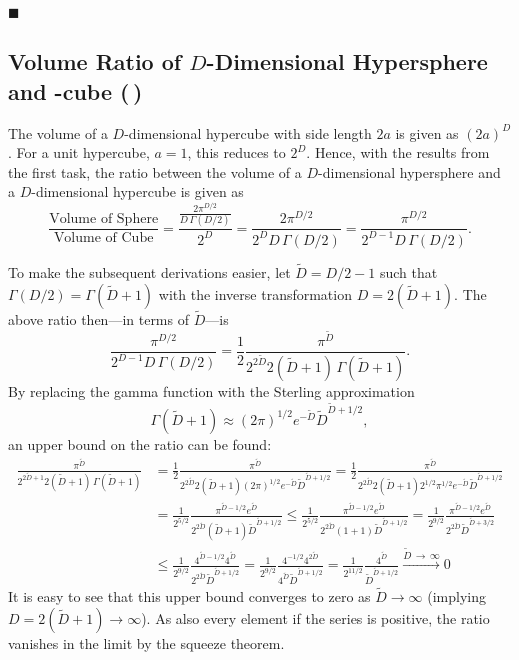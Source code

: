 \documentclass[11pt, a4paper]{scrartcl}
\newcommand{\eot}{\hfill\(\blacksquare\)}
\newcommand{\diffstar}{\texorpdfstring{\raisebox{-1pt}{\resizebox{!}{8pt}{\(\star\)}}}{*}}
\newcommand{\twostar}  {(\diffstar\,\diffstar)}
\begin{document}
			\eot

		\subsection{Volume Ratio of \(D\)-Dimensional Hypersphere and -cube  \twostar}
			The volume of a \(D\)-dimensional hypercube with side length \(2a\) is given as \((2a)^D\). For a unit hypercube, \(a = 1\), this reduces to \(2^D\). Hence, with the results from the first task, the ratio between the volume of a \(D\)-dimensional hypersphere and a \(D\)-dimensional hypercube is given as
			\begin{equation}
				\frac{\text{Volume of Sphere}}{\text{Volume of Cube}}
					= \frac{\frac{2 \pi^{D/2}}{D \, \Gamma(D / 2)}}{2^D}
					= \frac{2 \pi^{D/2}}{2^D D \, \Gamma(D / 2)}
					= \frac{\pi^{D/2}}{2^{D - 1} D \, \Gamma(D / 2)}.
			\end{equation}

			To make the subsequent derivations easier, let \( \tilde{D} = D/2 - 1 \) such that \( \Gamma(D/2) = \Gamma(\tilde{D} + 1) \) with the inverse transformation \( D = 2 (\tilde{D} + 1) \). The above ratio then---in terms of \(\tilde{D}\)---is
			\begin{equation}
				\frac{\pi^{D/2}}{2^{D - 1} D \, \Gamma(D / 2)}
					= \frac{1}{2} \frac{\pi^{\tilde{D}}}{2^{2 \tilde{D}} 2 (\tilde{D} + 1) \, \Gamma(\tilde{D} + 1)}.
			\end{equation}
			By replacing the gamma function with the Sterling approximation
			\begin{equation}
				\Gamma(\tilde{D} + 1) \approx (2\pi)^{1/2} e^{-\tilde{D}} \tilde{D}^{\tilde{D} + 1/2},
			\end{equation}
			an upper bound on the ratio can be found:
			\begin{align}
				\frac{\pi^{\tilde{D}}}{2^{2 \tilde{D} + 1} 2 (\tilde{D} + 1) \, \Gamma(\tilde{D} + 1)}
					&= \frac{1}{2} \frac{\pi^{\tilde{D}}}{2^{2 \tilde{D}} 2 (\tilde{D} + 1) (2\pi)^{1/2} e^{-\tilde{D}} \tilde{D}^{\tilde{D} + 1/2}}
					 = \frac{1}{2} \frac{\pi^{\tilde{D}}}{2^{2 \tilde{D}} 2 (\tilde{D} + 1) 2^{1/2} \pi^{1/2} e^{-\tilde{D}} \tilde{D}^{\tilde{D} + 1/2}} \\
					&= \frac{1}{2^{5/2}} \frac{\pi^{\tilde{D} - 1/2} e^{\tilde{D}}}{2^{2 \tilde{D}} (\tilde{D} + 1) \tilde{D}^{\tilde{D} + 1/2}}
					 \leq \frac{1}{2^{5/2}} \frac{\pi^{\tilde{D} - 1/2} e^{\tilde{D}}}{2^{2 \tilde{D}} (1 + 1) \tilde{D}^{\tilde{D} + 1/2}}
					 = \frac{1}{2^{9/2}} \frac{\pi^{\tilde{D} - 1/2} e^{\tilde{D}}}{2^{2 \tilde{D}} \tilde{D}^{\tilde{D} + 3/2}} \\
					&\leq \frac{1}{2^{9/2}} \frac{4^{\tilde{D} - 1/2} 4^{\tilde{D}}}{2^{2 \tilde{D}} \tilde{D}^{\tilde{D} + 1/2}}
					 = \frac{1}{2^{9/2}} \frac{4^{-1/2} 4^{2\tilde{D}}}{4^{\tilde{D}} \tilde{D}^{\tilde{D} + 1/2}}
					 = \frac{1}{2^{11/2}} \frac{4^{\tilde{D}}}{\tilde{D}^{\tilde{D} + 1/2}}
					 \overset{\tilde{D} \,\to\, \infty}{\to} 0
			\end{align}
			It is easy to see that this upper bound converges to zero as \( \tilde{D} \to \infty \) (implying \( D = 2 (\tilde{D} + 1) \to \infty \)). As also every element if the series is positive, the ratio vanishes in the limit by the squeeze theorem.
\end{document}
